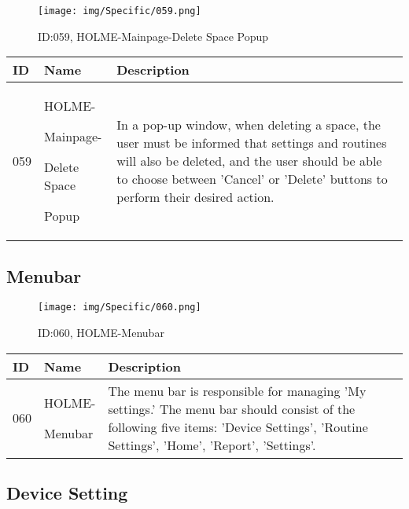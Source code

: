 \documentclass[conference]{IEEEtran}
\begin{document}
\begin{enumerate}
\begin{figure}[h]
\centering
\texttt{[image: img/Specific/059.png]}
\caption{ID:059, HOLME-Mainpage-Delete Space Popup}
\end{figure}
\begin{table}[h]
\def\arraystretch{1.2} \small
    \begin{tabular}{|p{1cm}|p{1.8cm}|p{5.0cm}|}
        \hline
        ID & Name & Description\\ \hline
         059 \par  & HOLME-\par Mainpage-\par Delete Space\par Popup  &In a pop-up window, when deleting a space, the user must be informed that settings and routines will also be deleted, and the user should be able to choose between 'Cancel' or 'Delete' buttons to perform their desired action.\\ \hline
    \end{tabular}
\end{table}

\vspace{6cm}

\subsection{Menubar}
\begin{figure}[h]
\centering
\texttt{[image: img/Specific/060.png]}
\caption{ID:060, HOLME-Menubar}
\end{figure}
\begin{table}[h]
\def\arraystretch{1.2} \small
    \begin{tabular}{|p{1cm}|p{1.8cm}|p{5.0cm}|}
        \hline
        ID & Name & Description\\ \hline
         060 \par  & HOLME-\par Menubar  &The menu bar is responsible for managing 'My settings.' The menu bar should consist of the following five items: 'Device Settings', 'Routine Settings', 'Home', 'Report', 'Settings'.\\ \hline
    \end{tabular}
\end{table}

\subsection{Device Setting}


\end{enumerate}
\end{document}
